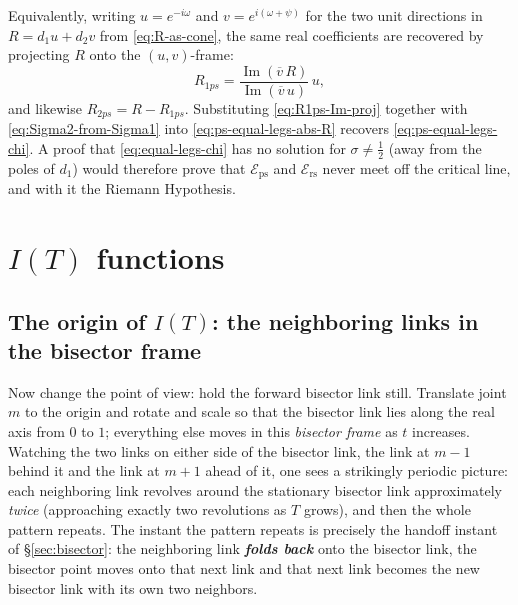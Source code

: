 \documentclass[11pt]{article}
\theoremstyle{definition}
\begin{document}
Equivalently, writing $u=e^{-i\omega}$ and $v=e^{i(\omega+\psi)}$ for the two
unit directions in $R=d_1 u+d_2 v$ from \eqref{eq:R-as-cone}, the same real
coefficients are recovered by projecting $R$ onto the $(u,v)$-frame:
\begin{equation}\label{eq:R1ps-Im-proj}
R_{1ps}
=
\frac{\operatorname{Im}(\overline{v}\,R)}{\operatorname{Im}(\overline{v}\,u)}\,u,
\end{equation}
and likewise $R_{2ps}=R-R_{1ps}$. Substituting \eqref{eq:R1ps-Im-proj} together
with \eqref{eq:Sigma2-from-Sigma1} into \eqref{eq:ps-equal-legs-abs-R} recovers
\eqref{eq:ps-equal-legs-chi}. A proof that
\eqref{eq:equal-legs-chi} has no solution for $\sigma\neq\tfrac12$ (away from
the poles of $d_1$) would therefore prove that $\mathcal{E}_{\mathrm{ps}}$ and
$\mathcal{E}_{\mathrm{rs}}$ never meet off the critical line, and with it the
Riemann Hypothesis.

\clearpage
\section{\texorpdfstring{$I(T)$}{I(T)} functions}\label{sec:IT-functions}

\subsection{The origin of \texorpdfstring{$I(T)$}{I(T)}: the neighboring links in the bisector frame}\label{sec:IT-origin}

Now change the point of view: hold the forward bisector link still. Translate
joint $m$ to the origin and rotate and scale so that the bisector link lies
along the real axis from $0$ to $1$; everything else moves in this \emph{bisector
frame} as $t$ increases. Watching the two links on either side of the bisector
link, the link at $m-1$ behind it and the link at $m+1$ ahead of it, one
sees a strikingly periodic picture: each neighboring link revolves around the
stationary bisector link approximately \emph{twice} (approaching exactly two
revolutions as $T$ grows), and then the whole pattern repeats. The instant the
pattern repeats is precisely the handoff instant of \S\ref{sec:bisector}: the
neighboring link \textbf{\emph{folds back}} onto the bisector link, the bisector point moves
onto that next link and that next link becomes the new bisector link with its own two
neighbors.
\end{document}

